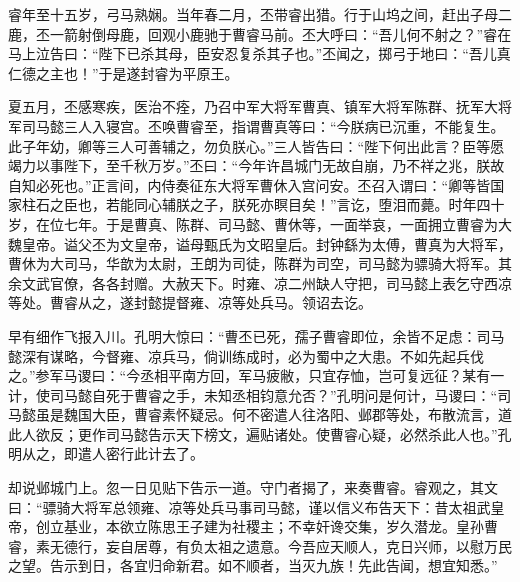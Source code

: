 睿年至十五岁，弓马熟娴。当年春二月，丕带睿出猎。行于山坞之间，赶出子母二鹿，丕一箭射倒母鹿，回观小鹿驰于曹睿马前。丕大呼曰：“吾儿何不射之？”睿在马上泣告曰：“陛下已杀其母，臣安忍复杀其子也。”丕闻之，掷弓于地曰：“吾儿真仁德之主也！”于是遂封睿为平原王。

夏五月，丕感寒疾，医治不痊，乃召中军大将军曹真、镇军大将军陈群、抚军大将军司马懿三人入寝宫。丕唤曹睿至，指谓曹真等曰：“今朕病已沉重，不能复生。此子年幼，卿等三人可善辅之，勿负朕心。”三人皆告曰：“陛下何出此言？臣等愿竭力以事陛下，至千秋万岁。”丕曰：“今年许昌城门无故自崩，乃不祥之兆，朕故自知必死也。”正言间，内侍奏征东大将军曹休入宫问安。丕召入谓曰：“卿等皆国家柱石之臣也，若能同心辅朕之子，朕死亦瞑目矣！”言讫，堕泪而薨。时年四十岁，在位七年。于是曹真、陈群、司马懿、曹休等，一面举哀，一面拥立曹睿为大魏皇帝。谥父丕为文皇帝，谥母甄氏为文昭皇后。封钟繇为太傅，曹真为大将军，曹休为大司马，华歆为太尉，王朗为司徒，陈群为司空，司马懿为骠骑大将军。其余文武官僚，各各封赠。大赦天下。时雍、凉二州缺人守把，司马懿上表乞守西凉等处。曹睿从之，遂封懿提督雍、凉等处兵马。领诏去讫。

早有细作飞报入川。孔明大惊曰：“曹丕已死，孺子曹睿即位，余皆不足虑：司马懿深有谋略，今督雍、凉兵马，倘训练成时，必为蜀中之大患。不如先起兵伐之。”参军马谡曰：“今丞相平南方回，军马疲敝，只宜存恤，岂可复远征？某有一计，使司马懿自死于曹睿之手，未知丞相钧意允否？”孔明问是何计，马谡曰：“司马懿虽是魏国大臣，曹睿素怀疑忌。何不密遣人往洛阳、邺郡等处，布散流言，道此人欲反；更作司马懿告示天下榜文，遍贴诸处。使曹睿心疑，必然杀此人也。”孔明从之，即遣人密行此计去了。

却说邺城门上。忽一日见贴下告示一道。守门者揭了，来奏曹睿。睿观之，其文曰：“骠骑大将军总领雍、凉等处兵马事司马懿，谨以信义布告天下：昔太祖武皇帝，创立基业，本欲立陈思王子建为社稷主；不幸奸谗交集，岁久潜龙。皇孙曹睿，素无德行，妄自居尊，有负太祖之遗意。今吾应天顺人，克日兴师，以慰万民之望。告示到日，各宜归命新君。如不顺者，当灭九族！先此告闻，想宜知悉。”

